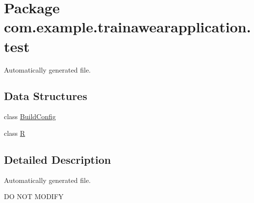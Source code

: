 \hypertarget{namespacecom_1_1example_1_1trainawearapplication_1_1test}{}\section{Package com.\+example.\+trainawearapplication.\+test}
\label{namespacecom_1_1example_1_1trainawearapplication_1_1test}


Automatically generated file.  


\subsection*{Data Structures}
\begin{DoxyCompactItemize}
\item 
class \mbox{\hyperlink{classcom_1_1example_1_1trainawearapplication_1_1test_1_1_build_config}{Build\+Config}}
\item 
class \mbox{\hyperlink{classcom_1_1example_1_1trainawearapplication_1_1test_1_1_r}{R}}
\end{DoxyCompactItemize}


\subsection{Detailed Description}
Automatically generated file. 

DO N\+OT M\+O\+D\+I\+FY 